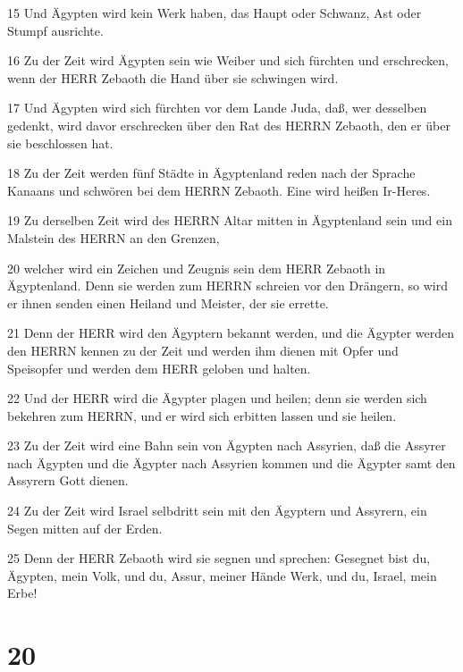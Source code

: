 \par 15 Und Ägypten wird kein Werk haben, das Haupt oder Schwanz, Ast oder Stumpf ausrichte.
\par 16 Zu der Zeit wird Ägypten sein wie Weiber und sich fürchten und erschrecken, wenn der HERR Zebaoth die Hand über sie schwingen wird.
\par 17 Und Ägypten wird sich fürchten vor dem Lande Juda, daß, wer desselben gedenkt, wird davor erschrecken über den Rat des HERRN Zebaoth, den er über sie beschlossen hat.
\par 18 Zu der Zeit werden fünf Städte in Ägyptenland reden nach der Sprache Kanaans und schwören bei dem HERRN Zebaoth. Eine wird heißen Ir-Heres.
\par 19 Zu derselben Zeit wird des HERRN Altar mitten in Ägyptenland sein und ein Malstein des HERRN an den Grenzen,
\par 20 welcher wird ein Zeichen und Zeugnis sein dem HERR Zebaoth in Ägyptenland. Denn sie werden zum HERRN schreien vor den Drängern, so wird er ihnen senden einen Heiland und Meister, der sie errette.
\par 21 Denn der HERR wird den Ägyptern bekannt werden, und die Ägypter werden den HERRN kennen zu der Zeit und werden ihm dienen mit Opfer und Speisopfer und werden dem HERR geloben und halten.
\par 22 Und der HERR wird die Ägypter plagen und heilen; denn sie werden sich bekehren zum HERRN, und er wird sich erbitten lassen und sie heilen.
\par 23 Zu der Zeit wird eine Bahn sein von Ägypten nach Assyrien, daß die Assyrer nach Ägypten und die Ägypter nach Assyrien kommen und die Ägypter samt den Assyrern Gott dienen.
\par 24 Zu der Zeit wird Israel selbdritt sein mit den Ägyptern und Assyrern, ein Segen mitten auf der Erden.
\par 25 Denn der HERR Zebaoth wird sie segnen und sprechen: Gesegnet bist du, Ägypten, mein Volk, und du, Assur, meiner Hände Werk, und du, Israel, mein Erbe!

\chapter{20}

